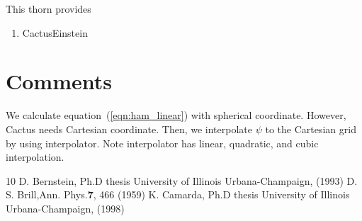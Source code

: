 \documentclass{article}
\begin{document}
This thorn provides
 \begin{enumerate}
  \item CactusEinstein
 \end{enumerate}

\section{Comments}

We calculate equation~(\ref{eqn:ham_linear}) with spherical
coordinate.  However, Cactus needs Cartesian coordinate.  Then, we
interpolate $\psi$ to the Cartesian grid by using interpolator.  Note
interpolator has linear, quadratic, and cubic interpolation.  





\begin{thebibliography}{10}
  D. Bernstein, Ph.D thesis University of Illinois Urbana-Champaign,
  (1993)
  D. S. Brill,Ann. Phys.{\bf 7}, 466 (1959)
  K. Camarda, Ph.D thesis University of Illinois Urbana-Champaign, (1998)
\end{thebibliography}
\end{document}
